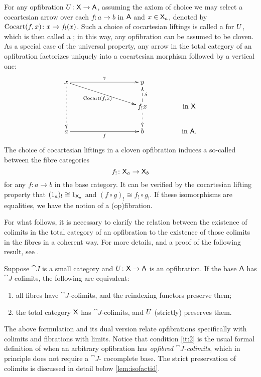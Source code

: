 \documentclass{amsart}
\begin{document}
For any opfibration $U\colon \mathsf{X} \to\mathsf{A}$, assuming the axiom of choice we may select a cocartesian arrow over each $f\colon a\to b$ in $\mathsf{A}$ and $x\in\mathsf{X}_a$, denoted by $\mathrm{Cocart}(f,x)\colon x\to f_!(x)$. Such a choice of cocartesian liftings is called a  for $U$, which is then called a ; in this way, any opfibration can be assumed to be cloven. As a special case of the universal property, any arrow in the total category of an opfibration factorizes uniquely into a cocartesian morphism followed by a vertical one:
\begin{equation}\label{factor}
\xymatrix @C=.6in @R=.3in
{x \ar @{.>}[dd]\ar[rr]^\gamma \ar[drr]_-{\Cocart(f,x)} && y &\\
&& f_!x \ar @{-->}[u]_-{\delta} \ar @{.>}[d] & \textrm{in }\X  \\
a\ar[rr]_-{f} && b & \textrm{in }\A.}
\end{equation}
The choice of cocartesian liftings in a cloven opfibration induces a so-called  between the fibre categories
\begin{equation}\label{reindexing}
 f_!\colon\mathsf{X}_a\to\mathsf{X}_b
\end{equation}
for any $f\colon a\to b$ in the base category. It can be verified by the cocartesian lifting property that $(1_a)_!\cong1_{\mathsf{X}_a}$ and $(f\circ g)_!\cong f_!\circ g_!$. If these isomorphisms are equalities, we have the notion of a  (op)fibration.

For what follows, it is necessary to clarify the relation between the existence of colimits in the total category of an opfibration to the existence of those colimits in the fibres in a coherent way. For more details, and a proof of the following result, see \cite[Cor. 3.7]{FibredAdjunctions}.

\begin{lem}\label{lem:fibrewiselimits}
Suppose $\cat{J}$ is a small category and $U\colon\mathsf{X}\to\mathsf{A}$ is an opfibration. If the base $\mathsf{A}$ has $\cat{J}$-colimits,
the following are equivalent:
\begin{enumerate}
 \item all fibres have $\cat{J}$-colimits, and the reindexing functors preserve them; \label{it:2}
 \item the total category $\mathsf{X}$ has $\cat{J}$-colimits, and $U$ (strictly) preserves them.
\end{enumerate}
\end{lem}
The above formulation and its dual version relate opfibrations specifically with colimits and fibrations with limits. Notice that condition \ref{it:2} is the usual formal definition of when an arbitrary opfibration has \emph{opfibred $\cat{J}$-colimits}, which in principle does not require a $\cat{J}$-
cocomplete base. The strict preservation of colimits is discussed in detail below \cref{lem:isofactid}.
\end{document}
